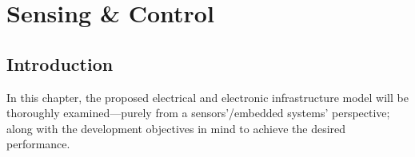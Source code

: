 




\newpage
\chapter{Sensing \& Control}
\section{Introduction}
In this chapter, the proposed electrical and electronic infrastructure model will be thoroughly examined---purely from a sensors'/embedded systems' perspective; along with the development objectives in mind to achieve the desired performance.




